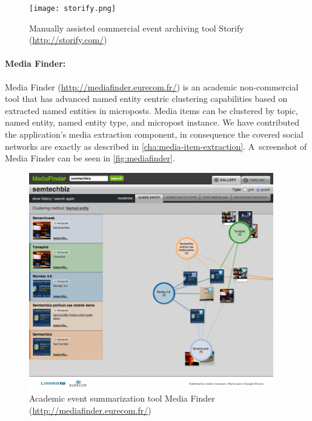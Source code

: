 \begin{figure}
  \centering
  \texttt{[image: storify.png]}
  \caption[Manually assisted commercial event archiving tool Storify]{Manually assisted commercial event archiving tool Storify
    (\url{http://storify.com/})}
  \label{fig:storify}
\end{figure}

\paragraph{Media Finder:}

Media Finder (\url{http://mediafinder.eurecom.fr/})
is an academic non-commercial tool that
has advanced named entity centric clustering capabilities
based on extracted named entities in microposts.
Media items can be clustered by topic, named entity,
named entity type, and micropost instance.
We have contributed the application's media extraction component,
in consequence the covered social networks
are exactly as described in \autoref{cha:media-item-extraction}.
A~screenshot of Media Finder can be seen in \autoref{fig:mediafinder}.

\begin{figure}
  \centering
  \includegraphics[width=0.95\textwidth,height=0.9\textheight,keepaspectratio]{mediafinder.png}
  \caption[Academic event summarization tool Media Finder]{Academic event summarization tool Media Finder (\url{http://mediafinder.eurecom.fr/})}
  \label{fig:mediafinder}
\end{figure}

